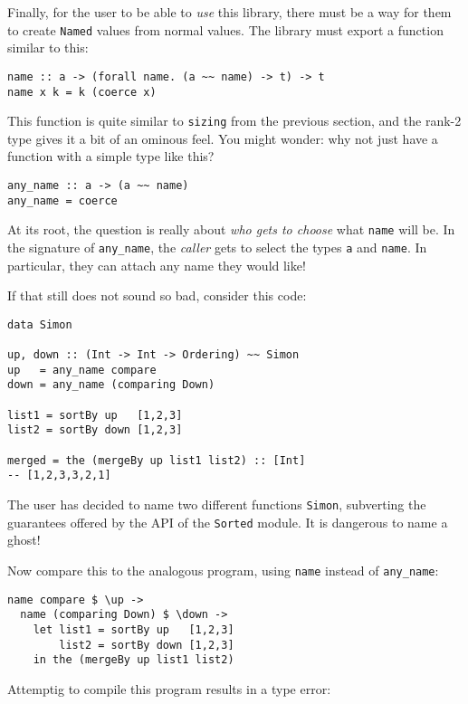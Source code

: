 \documentclass[format=sigplan, review=false, screen=true]{acmart}
\begin{document}
Finally, for the user to be able to \emph{use} this library, there must be a way for
them to create \texttt{Named} values from normal values. The library must export a
function similar to this:

\begin{verbatim}
name :: a -> (forall name. (a ~~ name) -> t) -> t
name x k = k (coerce x)
\end{verbatim}

This function is quite similar to \texttt{sizing} from the previous section, and the rank-2
type gives it a bit of an ominous feel. You might wonder: why not just have a function
with a simple type like this?

\begin{verbatim}
any_name :: a -> (a ~~ name)
any_name = coerce
\end{verbatim}

At its root, the question is really about \emph{who gets to choose} what \texttt{name} will be.
In the signature of \texttt{any\_name}, the \emph{caller} gets to select the types \texttt{a}
and \texttt{name}. In particular, they can attach any name they would like!

If that still does not sound so bad, consider this code:

\begin{verbatim}
data Simon
  
up, down :: (Int -> Int -> Ordering) ~~ Simon
up   = any_name compare
down = any_name (comparing Down)

list1 = sortBy up   [1,2,3]
list2 = sortBy down [1,2,3]

merged = the (mergeBy up list1 list2) :: [Int]
-- [1,2,3,3,2,1]
\end{verbatim}
\noindent
The user has decided to name two different functions \texttt{Simon}, subverting the
guarantees offered by the API of the \texttt{Sorted} module. It is dangerous to
name a ghost!

Now compare this to the analogous program, using \texttt{name} instead of \texttt{any\_name}:
\begin{verbatim}
name compare $ \up ->
  name (comparing Down) $ \down ->
    let list1 = sortBy up   [1,2,3]
        list2 = sortBy down [1,2,3]
    in the (mergeBy up list1 list2)
\end{verbatim}
\noindent
Attemptig to compile this program results in a type error:
\end{document}
